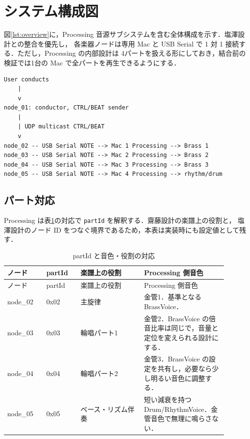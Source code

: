 \documentclass[lualatex,book,openany,paper=a4paper,jafontsize=11.5pt,jafontscale=1.05]{jlreq}
\begin{document}
\section{システム構成図}
図\ref{lst:overview}に，Processing 音源サブシステムを含む全体構成を示す．塩澤設計との整合を優先し，
各楽器ノードは専用 Mac と USB Serial で 1 対 1 接続する．ただし，Processing の内部設計は
4パートを扱える形にしておき，結合前の検証では1台の Mac で全パートを再生できるようにする．

\begin{lstlisting}[style=textdiagram, caption={Processing 音源サブシステムを含む全体構成}, label={lst:overview}]
User conducts
    |
    v
node_01: conductor, CTRL/BEAT sender
    |
    | UDP multicast CTRL/BEAT
    v
node_02 -- USB Serial NOTE --> Mac 1 Processing --> Brass 1
node_03 -- USB Serial NOTE --> Mac 2 Processing --> Brass 2
node_04 -- USB Serial NOTE --> Mac 3 Processing --> Brass 3
node_05 -- USB Serial NOTE --> Mac 4 Processing --> rhythm/drum
\end{lstlisting}

\subsection{パート対応}
Processing は表\ref{tab:part-map}の対応で \texttt{partId} を解釈する．齋藤設計の楽譜上の役割と，
塩澤設計のノード ID をつなぐ境界であるため，本表は実装時にも設定値として残す．

\begin{longtable}{p{0.16\linewidth}p{0.14\linewidth}p{0.26\linewidth}p{0.34\linewidth}}
\caption{partId と音色・役割の対応}\label{tab:part-map}\\
\hline
ノード & partId & 楽譜上の役割 & Processing 側音色 \\
\hline
\endfirsthead
\hline
ノード & partId & 楽譜上の役割 & Processing 側音色 \\
\hline
\endhead
node\_02 & 0x02 & 主旋律 & 金管1．基準となる BrassVoice． \\
\hline
node\_03 & 0x03 & 輪唱パート1 & 金管2．BrassVoice の倍音比率は同じで，音量と定位を変えられる設計にする． \\
\hline
node\_04 & 0x04 & 輪唱パート2 & 金管3．BrassVoice の設定を共有し，必要なら少し明るい音色に調整する． \\
\hline
node\_05 & 0x05 & ベース・リズム伴奏 & 短い減衰を持つ Drum/RhythmVoice．金管音色で無理に鳴らさない． \\
\hline
\end{longtable}
\end{document}
